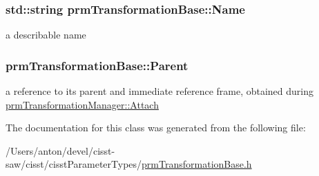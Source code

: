 \subsubsection[{Name}]{\setlength{\rightskip}{0pt plus 5cm}std\+::string prm\+Transformation\+Base\+::\+Name\hspace{0.3cm}{\ttfamily [protected]}}\label{classprm_transformation_base_a4f96f394eb3f9d40077d8bc5825de87d}
a describable name \hypertarget{classprm_transformation_base_a628228ce0f8caa0e5d7a46a61d3b548d}{}
\subsubsection[{Parent}]{ prm\+Transformation\+Base\+::\+Parent\hspace{0.3cm}{\ttfamily [protected]}}\label{classprm_transformation_base_a628228ce0f8caa0e5d7a46a61d3b548d}
a reference to its parent and immediate reference frame, obtained during \hyperlink{classprm_transformation_manager_a5fbac7977cdd5b1ba5aa714bdd43ebce}{prm\+Transformation\+Manager\+::\+Attach} 

The documentation for this class was generated from the following file\+:\begin{DoxyCompactItemize}
\item 
/\+Users/anton/devel/cisst-\/saw/cisst/cisst\+Parameter\+Types/\hyperlink{prm_transformation_base_8h}{prm\+Transformation\+Base.\+h}\end{DoxyCompactItemize}
